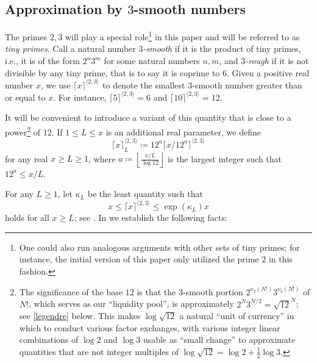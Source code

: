 \documentclass[12pt,a4paper,reqno]{amsart}
\numberwithin{equation}{section}
\theoremstyle{plain}
\theoremstyle{definition}
\begin{document}
\subsection{Approximation by \texorpdfstring{$3$}{3}-smooth numbers} 

The primes $2,3$ will play a special role\footnote{One could also run analogous arguments with other sets of tiny primes; for instance, the initial version \cite{tao} of this paper only utilized the prime $2$ in this fashion.} in this paper and will be referred to as \emph{tiny primes}. 
Call a natural number \emph{$3$-smooth} if it is the product of tiny primes, i.e., it is of the form $2^n 3^m$ for some natural numbers $n,m$, and \emph{$3$-rough} if it is not divisible by any tiny prime, that is to say it is coprime to $6$.  Given a positive real number $x$, we use $\lceil x \rceil^{\langle 2,3 \rangle}$ to denote the smallest $3$-smooth number greater than or equal to $x$.  For instance, $\lceil 5 \rceil^{\langle 2,3 \rangle} = 6$ and $\lceil 10 \rceil^{\langle 2,3 \rangle} = 12$.  

It will be convenient to introduce a variant of this quantity that is close to a power\footnote{The significance of the base $12$ is that the $3$-smooth portion $2^{\nu_2(N!)} 3^{\nu_3(N!)}$ of $N!$, which serves as our ``liquidity pool'', is approximately $2^N 3^{N/2} = \sqrt{12}^{N}$; see \eqref{legendre} below.  This makes $\log \sqrt{12}$ a natural ``unit of currency'' in which to conduct various factor exchanges, with various integer linear combinations of $\log 2$ and $\log 3$ usable as ``small change'' to approximate quantities that are not integer multiples of $\log \sqrt{12} = \log 2 + \frac{1}{2} \log 3$.} of $12$.  If $1 \leq L \leq x$ is an additional real parameter, we define
\begin{equation}\label{fancy-kappa-def}
  \lceil x \rceil^{\langle 2,3\rangle}_L \coloneqq 12^a \lceil x/12^a \rceil^{\langle 2,3 \rangle}
\end{equation}
for any real $x \geq L \geq 1$, where $a \coloneqq \left\lfloor \frac{x/L}{\log 12} \right\rfloor$ is the largest integer such that $12^a \leq x/L$.

For any $L \geq 1$, let $\kappa_L$ be the least quantity such that
\begin{equation}\label{kappa-def}  
  x \leq \lceil x \rceil^{\langle 2,3\rangle} \leq \exp(\kappa_L) x 
\end{equation}
holds for all $x \geq L$; see .  In  we establish the following facts:
\end{document}
